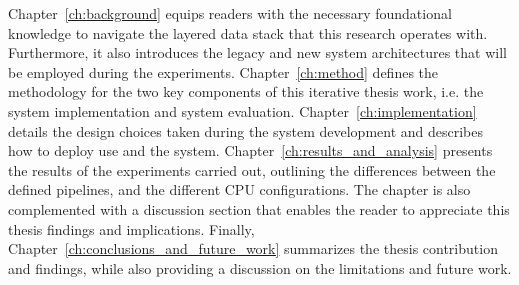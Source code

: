 Chapter~\ref{ch:background} equips readers with the necessary foundational knowledge to navigate the layered data stack that this research operates with. Furthermore, it also introduces the legacy and new system architectures that will be employed during the experiments. Chapter~\ref{ch:method} defines the methodology for the two key components of this iterative thesis work, i.e. the system implementation and system evaluation. Chapter~\ref{ch:implementation} details the design choices taken during the system development and describes how to deploy use and the system.  
Chapter~\ref{ch:results_and_analysis} presents the results of the experiments carried out, outlining the differences between the defined pipelines, and the different \gls{CPU} configurations. The chapter is also complemented with a discussion section that enables the reader to appreciate this thesis findings and implications. Finally, Chapter~\ref{ch:conclusions_and_future_work} summarizes the thesis contribution and findings, while also providing a discussion on the limitations and future work.